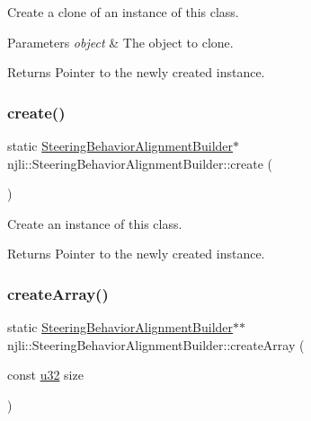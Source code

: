 Create a clone of an instance of this class.


\begin{DoxyParams}{Parameters}
{\em object} & The object to clone.\\
\hline
\end{DoxyParams}
\begin{DoxyReturn}{Returns}
Pointer to the newly created instance. 
\end{DoxyReturn}
\mbox{\label{classnjli_1_1_steering_behavior_alignment_builder_acefa2b1317e3025d7d7f7124bdeec9ec}} 
\subsubsection{\texorpdfstring{create()}{create()}}
{\footnotesize\ttfamily static \mbox{\hyperlink{classnjli_1_1_steering_behavior_alignment_builder}{Steering\+Behavior\+Alignment\+Builder}}$\ast$ njli\+::\+Steering\+Behavior\+Alignment\+Builder\+::create (\begin{DoxyParamCaption}{ }\end{DoxyParamCaption})\hspace{0.3cm}{\ttfamily [static]}}

Create an instance of this class.

\begin{DoxyReturn}{Returns}
Pointer to the newly created instance. 
\end{DoxyReturn}
\mbox{\label{classnjli_1_1_steering_behavior_alignment_builder_a2b20b08ca30103ac16df269bd89fb446}} 
\subsubsection{\texorpdfstring{create\+Array()}{createArray()}}
{\footnotesize\ttfamily static \mbox{\hyperlink{classnjli_1_1_steering_behavior_alignment_builder}{Steering\+Behavior\+Alignment\+Builder}}$\ast$$\ast$ njli\+::\+Steering\+Behavior\+Alignment\+Builder\+::create\+Array (\begin{DoxyParamCaption}\item[{const \mbox{\hyperlink{_util_8h_a10e94b422ef0c20dcdec20d31a1f5049}{u32}}}]{size }\end{DoxyParamCaption})\hspace{0.3cm}{\ttfamily [static]}}

